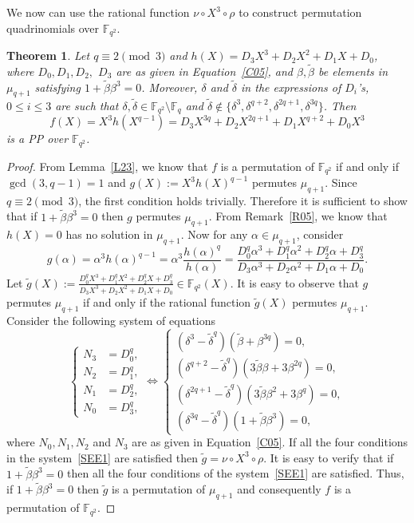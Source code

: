 \documentclass[12pt]{amsart}
\newtheorem{thm}{Theorem}[section]
\numberwithin{equation}{section}
\theoremstyle{definition}
\newcommand{\F}{\mathbb F}
\begin{document}
We now can use the rational function ${\nu} \circ X^3 \circ \rho$ to construct permutation quadrinomials over $\F_{q^2}$.

\begin{thm}\label{T05}
Let $q\equiv 2 \pmod 3$ and $h(X)=D_3X^3+D_2X^2 +D_1X+D_0$, where $D_0, D_1, D_2,$ $D_3$ are as given in Equation~\eqref{C05},
and $\beta, {\tilde \beta}$ be elements in $\mu_{q+1}$ satisfying $1+{\tilde \beta}\beta^3=0$. Moreover, $\delta$ and $\tilde \delta$ in the expressions of $D_i$'s, $0 \leq i \leq 3$ are such that $\delta, \tilde \delta \in \F_{q^2}\setminus\F_{q}$ and $\tilde \delta \not \in \{ \delta^3, \delta^{q+2}, \delta^{2q+1}, \delta^{3q}\}$. Then 
$$
f(X)=X^3h(X^{q-1}) = D_3X^{3q}+D_2X^{2q+1} +D_1X^{q+2}+D_0X^3
$$ is a PP over $\F_{q^2}$.

\end{thm}
\begin{proof}
From Lemma~\ref{L23}, we know that $f$ is a permutation of $\F_{q^2}$ if and only if $\gcd(3,q-1)=1$ and $g(X):=X^3h(X)^{q-1}$ permutes $\mu_{q+1}$. Since $q\equiv 2 \pmod 3$, the first condition holds trivially. Therefore it is sufficient to show that if $1+{\tilde \beta}\beta^3=0$ then $g$ permutes $\mu_{q+1}$. From Remark~\ref{R05}, we know that $h(X)=0$ has no solution in $\mu_{q+1}$. Now for any $\alpha \in \mu_{q+1}$, consider
 \[
  g(\alpha)= \alpha^3h(\alpha)^{q-1}=\alpha^3\frac{h(\alpha)^q}{h(\alpha)}= \frac{D_0^q\alpha^3+D_1^q\alpha^2 +D_2^q\alpha+D_3^q}{D_3\alpha^3+D_2\alpha^2 +D_1\alpha+D_0}.
 \]
Let $\displaystyle {\tilde g}(X):= \frac{D_0^qX^3+D_1^qX^2 +D_2^qX+D_3^q}{D_3X^3+D_2X^2 +D_1X+D_0} \in \F_{q^2}(X)$. It is easy to observe that $g$ permutes $\mu_{q+1}$ if and only if the rational function ${\tilde g}(X)$ permutes $\mu_{q+1}$. Consider the following system of equations
\begin{equation} \label{SEE1}
  \begin{cases}
   N_3 &= D_0^q,\\
   N_2 &= D_1^q,\\
   N_1 &= D_2^q,\\
   N_0 &= D_3^q,
  \end{cases}
  \iff
  \begin{cases}
   (\delta^3-{\tilde \delta}^q)({\tilde \beta} +\beta^{3q})=0 ,\\
   (\delta^{q+2}-{\tilde \delta}^q)(3{\tilde \beta}\beta +3\beta^{2q})=0,\\
   (\delta^{2q+1}-{\tilde \delta}^q)(3{\tilde \beta}\beta^2+3\beta^q)=0,\\
   (\delta^{3q}-{\tilde \delta}^q)(1+{\tilde \beta}\beta^3)  = 0,
  \end{cases}
 \end{equation}
 where $N_0, N_1, N_2$ and $N_3$ are as given in Equation~\eqref{C05}. If all the four conditions in the system~\eqref{SEE1} are satisfied then ${\tilde g}={\nu} \circ X^3 \circ \rho$. It is easy to verify that if $1+{\tilde \beta}\beta^3=0$ then  all the four conditions of the system~\eqref{SEE1} are satisfied. Thus, if $1+{\tilde \beta}\beta^3=0$ then ${\tilde g}$ is a permutation of $\mu_{q+1}$ and consequently $f$ is a permutation of $\F_{q^2}$.
\end{proof}
\end{document}
